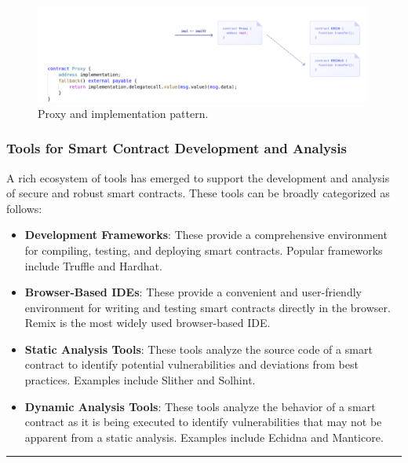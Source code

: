 \begin{figure}[t]
	\begin{center}
		\includegraphics[width=0.99\textwidth]{./figs/upgradable.png}
		\caption{Proxy and implementation pattern.}		
		\label{fig:upgradable}
	\end{center}	
\end{figure}


\subsubsection{Tools for Smart Contract Development and
	Analysis}\label{tools-for-smart-contract-development-and-analysis}

A rich ecosystem of tools has emerged to support the development and
analysis of secure and robust smart contracts. These tools can be
broadly categorized as follows:

\begin{itemize}
	\tightlist
	\item
	\textbf{Development Frameworks}: These provide a comprehensive
	environment for compiling, testing, and deploying smart contracts.
	Popular frameworks include Truffle and Hardhat.
	\item
	\textbf{Browser-Based IDEs}: These provide a convenient and
	user-friendly environment for writing and testing smart contracts
	directly in the browser. Remix is the most widely used browser-based
	IDE.
	\item
	\textbf{Static Analysis Tools}: These tools analyze the source code of
	a smart contract to identify potential vulnerabilities and deviations
	from best practices. Examples include Slither and Solhint.
	\item
	\textbf{Dynamic Analysis Tools}: These tools analyze the behavior of a
	smart contract as it is being executed to identify vulnerabilities
	that may not be apparent from a static analysis. Examples include
	Echidna and Manticore.
\end{itemize}

\begin{center}\rule{0.5\linewidth}{0.5pt}\end{center}

